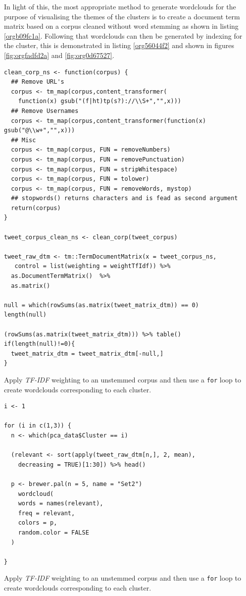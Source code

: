 \documentclass[11pt]{article}
\begin{document}
In light of this, the most appropriate method to generate wordclouds for the
purpose of visualising the themes of the clusters is to create a document term
matrix based on a corpus cleaned without word stemming as shown in listing \ref{orgb09fc1a}.
Following that wordclouds can then be generated by indexing for the cluster,
this is demonstrated in listing \ref{org56044f2} and shown in figures \ref{fig:orgfadfd2a} and \ref{fig:org0d67527}.


\begin{listing}[htbp]
\begin{verbatim}
clean_corp_ns <- function(corpus) {
  ## Remove URL's
  corpus <- tm_map(corpus,content_transformer(
    function(x) gsub("(f|ht)tp(s?)://\\S+","",x)))
  ## Remove Usernames
  corpus <- tm_map(corpus,content_transformer(function(x) gsub("@\\w+","",x)))
  ## Misc
  corpus <- tm_map(corpus, FUN = removeNumbers)
  corpus <- tm_map(corpus, FUN = removePunctuation)
  corpus <- tm_map(corpus, FUN = stripWhitespace)
  corpus <- tm_map(corpus, FUN = tolower)
  corpus <- tm_map(corpus, FUN = removeWords, mystop)
  ## stopwords() returns characters and is fead as second argument
  return(corpus)
}

tweet_corpus_clean_ns <- clean_corp(tweet_corpus)

tweet_raw_dtm <- tm::TermDocumentMatrix(x = tweet_corpus_ns,
   control = list(weighting = weightTfIdf)) %>%
  as.DocumentTermMatrix()  %>%
  as.matrix()

null = which(rowSums(as.matrix(tweet_matrix_dtm)) == 0)
length(null)

(rowSums(as.matrix(tweet_matrix_dtm))) %>% table()
if(length(null)!=0){
  tweet_matrix_dtm = tweet_matrix_dtm[-null,]
}

\end{verbatim}
\caption{\label{orgb09fc1a}Apply \emph{TF-IDF} weighting to an unstemmed corpus and then use a \texttt{for} loop to create wordclouds corresponding to each cluster.}
\end{listing}

\begin{listing}[htbp]
\begin{verbatim}
i <- 1

for (i in c(1,3)) {
  n <- which(pca_data$Cluster == i)

  (relevant <- sort(apply(tweet_raw_dtm[n,], 2, mean),
    decreasing = TRUE)[1:30]) %>% head()

  p <- brewer.pal(n = 5, name = "Set2")
    wordcloud(
    words = names(relevant),
    freq = relevant,
    colors = p,
    random.color = FALSE
  )

}
\end{verbatim}
\caption{\label{org56044f2}Apply \emph{TF-IDF} weighting to an unstemmed corpus and then use a \texttt{for} loop to create wordclouds corresponding to each cluster.}
\end{listing}
\end{document}
